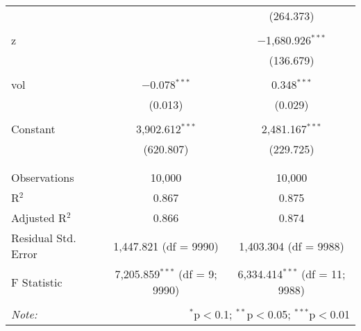 \begin{tabular}{@{\extracolsep{5pt}}lcc}
  &  & (264.373) \\ 
  & & \\ 
 z &  & $-$1,680.926$^{***}$ \\ 
  &  & (136.679) \\ 
  & & \\ 
 vol & $-$0.078$^{***}$ & 0.348$^{***}$ \\ 
  & (0.013) & (0.029) \\ 
  & & \\ 
 Constant & 3,902.612$^{***}$ & 2,481.167$^{***}$ \\ 
  & (620.807) & (229.725) \\ 
  & & \\ 
\hline \\[-1.8ex] 
Observations & 10,000 & 10,000 \\ 
R$^{2}$ & 0.867 & 0.875 \\ 
Adjusted R$^{2}$ & 0.866 & 0.874 \\ 
Residual Std. Error & 1,447.821 (df = 9990) & 1,403.304 (df = 9988) \\ 
F Statistic & 7,205.859$^{***}$ (df = 9; 9990) & 6,334.414$^{***}$ (df = 11; 9988) \\ 
\hline 
\hline \\[-1.8ex] 
\textit{Note:}  & \multicolumn{2}{r}{$^{*}$p$<$0.1; $^{**}$p$<$0.05; $^{***}$p$<$0.01} \\ 
\end{tabular} 
